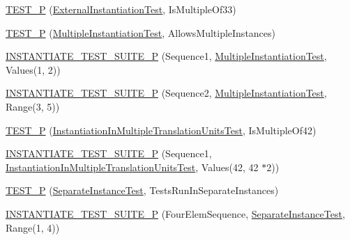 \begin{DoxyCompactItemize}
\item 
\mbox{\hyperlink{_obj__test_2lib_2googletest-master_2googletest_2test_2googletest-param-test-test_8cc_aaa93e4bed0890e2fdf1d7ae232315753}{T\+E\+S\+T\+\_\+P}} (\mbox{\hyperlink{class_external_instantiation_test}{External\+Instantiation\+Test}}, Is\+Multiple\+Of33)
\item 
\mbox{\hyperlink{_obj__test_2lib_2googletest-master_2googletest_2test_2googletest-param-test-test_8cc_ad1bbb42b9a1b3bf455ee0dcb4f8c4fb2}{T\+E\+S\+T\+\_\+P}} (\mbox{\hyperlink{class_multiple_instantiation_test}{Multiple\+Instantiation\+Test}}, Allows\+Multiple\+Instances)
\item 
\mbox{\hyperlink{_obj__test_2lib_2googletest-master_2googletest_2test_2googletest-param-test-test_8cc_a0a3fa5eeb95de2a56489864c2437e2ad}{I\+N\+S\+T\+A\+N\+T\+I\+A\+T\+E\+\_\+\+T\+E\+S\+T\+\_\+\+S\+U\+I\+T\+E\+\_\+P}} (Sequence1, \mbox{\hyperlink{class_multiple_instantiation_test}{Multiple\+Instantiation\+Test}}, Values(1, 2))
\item 
\mbox{\hyperlink{_obj__test_2lib_2googletest-master_2googletest_2test_2googletest-param-test-test_8cc_a0e7002f6418f9df074f641bbc5ed2578}{I\+N\+S\+T\+A\+N\+T\+I\+A\+T\+E\+\_\+\+T\+E\+S\+T\+\_\+\+S\+U\+I\+T\+E\+\_\+P}} (Sequence2, \mbox{\hyperlink{class_multiple_instantiation_test}{Multiple\+Instantiation\+Test}}, Range(3, 5))
\item 
\mbox{\hyperlink{_obj__test_2lib_2googletest-master_2googletest_2test_2googletest-param-test-test_8cc_a08ff04af48f7685f0ccd9adf4adc1cda}{T\+E\+S\+T\+\_\+P}} (\mbox{\hyperlink{class_instantiation_in_multiple_translation_units_test}{Instantiation\+In\+Multiple\+Translation\+Units\+Test}}, Is\+Multiple\+Of42)
\item 
\mbox{\hyperlink{_obj__test_2lib_2googletest-master_2googletest_2test_2googletest-param-test-test_8cc_a139ab089376ec6854c62cd7db2dd6c29}{I\+N\+S\+T\+A\+N\+T\+I\+A\+T\+E\+\_\+\+T\+E\+S\+T\+\_\+\+S\+U\+I\+T\+E\+\_\+P}} (Sequence1, \mbox{\hyperlink{class_instantiation_in_multiple_translation_units_test}{Instantiation\+In\+Multiple\+Translation\+Units\+Test}}, Values(42, 42 $\ast$2))
\item 
\mbox{\hyperlink{_obj__test_2lib_2googletest-master_2googletest_2test_2googletest-param-test-test_8cc_ae517694af7a7a007acd12e9a7247afe9}{T\+E\+S\+T\+\_\+P}} (\mbox{\hyperlink{class_separate_instance_test}{Separate\+Instance\+Test}}, Tests\+Run\+In\+Separate\+Instances)
\item 
\mbox{\hyperlink{_obj__test_2lib_2googletest-master_2googletest_2test_2googletest-param-test-test_8cc_a9e6e439e505cb20d67aa06a1c6d0e9af}{I\+N\+S\+T\+A\+N\+T\+I\+A\+T\+E\+\_\+\+T\+E\+S\+T\+\_\+\+S\+U\+I\+T\+E\+\_\+P}} (Four\+Elem\+Sequence, \mbox{\hyperlink{class_separate_instance_test}{Separate\+Instance\+Test}}, Range(1, 4))

\end{DoxyCompactItemize}

